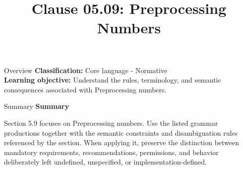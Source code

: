 \documentclass[10pt,letterpaper]{article}
\title{Clause 05.09: Preprocessing Numbers}
\author{}
\date{}
\begin{document}
\maketitle
\begin{CornellOverviewBox}{Overview}
\textbf{Classification:} Core language - Normative\\[2pt]
\textbf{Learning objective:} Understand the rules, terminology, and semantic consequences associated with Preprocessing numbers.
\end{CornellOverviewBox}\begin{CornellSummaryBox}{Summary}
{\sffamily\bfseries\color{Accent} Summary}\par\vspace{3pt}Section 5.9 focuses on Preprocessing numbers. Use the listed grammar productions together with the semantic constraints and disambiguation rules referenced by the section. When applying it, preserve the distinction between mandatory requirements, recommendations, permissions, and behavior deliberately left undefined, unspecified, or implementation-defined.
\end{CornellSummaryBox}
\end{document}
